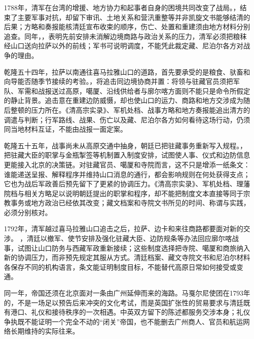 1788年，清军在台湾的增援、地方协力和起事者自身的困境共同改变了战局。，结束了主要军事对抗，却留下审讯、土地关系和营汛重整等并非凯旋文书能够结清的后果；方略和奏报能核清廷宣布收束的顺序，伤亡、处置和重建须由地方材料分别追查。同年，，表明先前安排未消解边境商路与政治关系的压力，清军必须把粮秣经山口送向拉萨以外的前线；军书可说明调度，不能凭此裁定藏、尼泊尔各方对战争的理由。

乾隆五十四年，拉萨以南通往喜马拉雅山口的道路，首先要承受的是粮食、驮畜和向导能否随季节接续的考验。，将追击同边境协商并置：将领与驻藏官员须把军队、军需和战报送过高原，噶厦、沿线供给者与廓尔喀方面则不能只是命令所假定的静止背景。追击意在重建边防威慑，却也使山口的运力、商路和地方交涉成为随后整顿的压力所在。《清高宗实录》、军机处档、战事方略和地方奏报能追出清方的调遣与判断；行军路线、战果、伤亡以及藏、尼泊尔各方如何看待这场行动，仍须同当地材料互证，不能由战报一面定案。

乾隆五十五年，战事尚未从高原交通中抽身，朝廷已把驻藏事务重新写入规程。，把驻藏大臣的职掌与金瓶掣签等机制置入制度安排，试图使人事、仪式和边防信息更能接入北京的决策链。对驻藏官员、噶厦和寺院而言，这不只是增添一纸条文：谁能递送呈报、解释程序并维持山口消息的通行，都会影响规则在何处获得支点；它也为战后军政善后预先留下了更紧的协调压力。《清高宗实录》、军机处档、理藩院档与相关方略足以说明朝廷提出的职掌和程序，却不能把制度文本直接等同于宗教事务或地方政治已经依其改变；藏文档案和寺院文书所见的时间、称谓与实践，必须分别核对。

1792年，清军越过喜马拉雅山口追击之后，拉萨、边卡和来往商路都要面对新的交涉。
，清廷以撤军、使节安排及强化驻藏大臣、边防规条等办法回应廓尔喀战事，试图让山口防务与西藏军政重新接续；这些制度选择把寺院、噶厦和商旅纳入新的协调压力，而非预先规定其服从方式。清廷档案、藏文寺院文书和尼泊尔材料各保存不同的机构语言，条文能证明制度目标，不能替代高原日常如何接受或变通。

同一年，帝国还须在北京面对一条由广州延伸而来的海路。马戛尔尼使团在1793年的，不是一场足以预告后来冲突的文化考试，而是英国扩张性的贸易要求与清廷既有港口、礼仪和接待秩序的一次相遇。中英双方留下的陈述都服务交涉本身；礼仪争执既不能证明一个完全不动的“闭关”帝国，也不能删去广州商人、官员和航运网络长期维持的实际往来。

